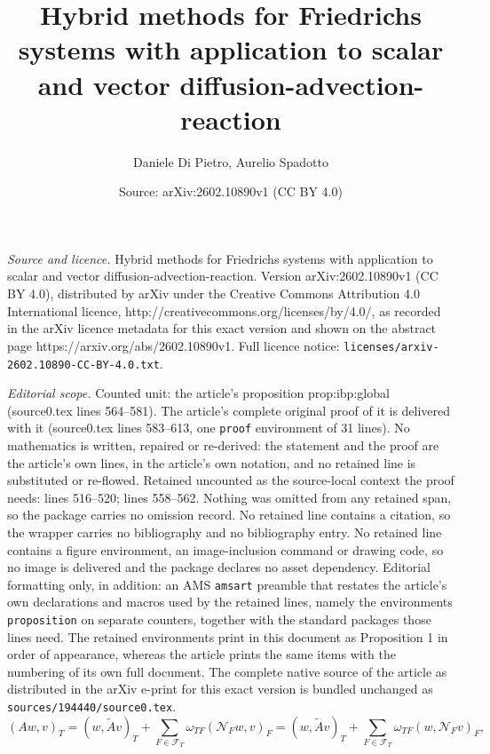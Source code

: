 \documentclass[10pt,a4paper]{amsart}
\title{Hybrid methods for Friedrichs systems with application to scalar and vector diffusion-advection-reaction}
\author{Daniele Di Pietro, Aurelio Spadotto}
\date{Source: arXiv:2602.10890v1 (CC BY 4.0)}
\newcommand{\FT}{\mathcal{F}_T}
\begin{document}
\maketitle

\noindent\emph{Source and licence.} Hybrid methods for Friedrichs systems with application to scalar and vector diffusion-advection-reaction. Version arXiv:2602.10890v1 (CC BY 4.0), distributed by arXiv under the Creative Commons Attribution 4.0 International licence, http://creativecommons.org/licenses/by/4.0/, as recorded in the arXiv licence metadata for this exact version and shown on the abstract page https://arxiv.org/abs/2602.10890v1. Full licence notice: \texttt{licenses/arxiv-2602.10890-CC-BY-4.0.txt}.\par\smallskip

\noindent\textit{Editorial scope.} Counted unit: the article's proposition prop:ibp:global (source0.tex lines 564--581). The article's complete original proof of it is delivered with it (source0.tex lines 583--613, one \texttt{proof} environment of 31 lines). No mathematics is written, repaired or re-derived: the statement and the proof are the article's own lines, in the article's own notation, and no retained line is substituted or re-flowed.  Retained uncounted as the source-local context the proof needs: lines 516--520; lines 558--562.  Nothing was omitted from any retained span, so the package carries no omission record.  No retained line contains a citation, so the wrapper carries no bibliography and no bibliography entry.  No retained line contains a figure environment, an image-inclusion command or drawing code, so no image is delivered and the package declares no asset dependency.  Editorial formatting only, in addition: an AMS \texttt{amsart} preamble that restates the article's own declarations and macros used by the retained lines, namely the environments \texttt{proposition} on separate counters, together with the standard packages those lines need.  The retained environments print in this document as Proposition 1 in order of appearance, whereas the article prints the same items with the numbering of its own full document.  The complete native source of the article as distributed in the arXiv e-print for this exact version is bundled unchanged as \texttt{sources/194440/source0.tex}.
\begin{equation}\label{eq:ibp:local}
  (A w, v)_T
  = (w, \tilde{A} v)_T + \sum_{F \in \FT} \omega_{TF} (\mathcal{N}_F w, v)_F
  = (w, \tilde{A} v)_T + \sum_{F \in \FT} \omega_{TF} (w, \mathcal{N}_F v)_F,
\end{equation}
\end{document}
